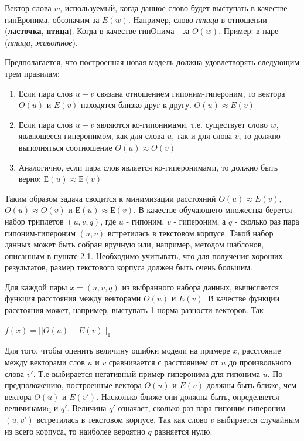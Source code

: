 Вектор слова \textbf{$w$}, используемый, когда данное слово будет выступать в качестве
гипЕронима, обозначим за \textbf{$E(w)$}. Например, слово \textit{птица} в отношении (\textbf{ласточка}, \textbf{птица}). Когда в качестве гипОнима - за \textbf{$O(w)$}. Пример: в паре (\textit{птица}, \textit{животное}).

Предполагается, что построенная новая модель должна удовлетворять следующим
трем правилам:

\begin{enumerate}
\item Если пара слов $u-v$ связана отношением гипоним-гипероним, то вектора $O(u)$ и $E(v)$ находятся близко друг к другу. $O(u) \approx E(v)$
\item Если пара слов $u-v$ являются ко-гипонимами, т.е. существует слово $w$,
являющееся гиперонимом, как для слова $u$, так и для слова $v$, то должно
выполняться соотношение $O(u) \approx O(v)$
\item Аналогично, если пара слов является ко-гиперонимами, то должно быть верно: $Е(u) \approx Е(v)$
\end{enumerate}

Таким образом задача сводится к минимизации расстояний $O(u) \approx E(v)$, $O(u) \approx O(v)$ и $Е(u) \approx Е(v)$.
В качестве обучающего множества берется набор триплетов $(u, v, q)$, где $u$ - гипоним, $v$ - гипероним, а $q$ - сколько раз пара гипоним-гипероним $(u, v)$ встретилась в текстовом корпусе. Такой набор данных может быть собран вручную или,
например, методом шаблонов, описанным в пункте 2.1. Необходимо учитывать, что
для получения хороших результатов, размер текстового корпуса должен быть
очень большим.

Для каждой пары $x = (u, v, q)$ из выбранного набора данных, вычисляется функция
расстояния между векторами $O(u)$ и $E(v)$. В качестве функции расстояния может,
например, выступать 1-норма разности векторов. Так

$f(x) = ||O(u) - E(v)||_1$

Для того, чтобы оценить величину ошибки модели на примере $x$, расстояние между
векторами слов $u$ и $v$ сравнивается с расстоянием от $u$ до произвольного слова $v'$.
Т.е выбирается негативный пример гиперонима для гипонима $u$. По
предположению, построенные вектора $O(u)$ и $E(v)$ должны быть ближе, чем
вектора $O(u)$ и $E(v')$. Насколько ближе они должны быть, определяется величинамиq и $q'$. Величина $q'$ означает, сколько раз пара гипоним-гипероним $(u, v')$
встретилась в текстовом корпусе. Так как слово $v$ выбирается случайным из всего
корпуса, то наиболее вероятно $q$ равняется нулю.

